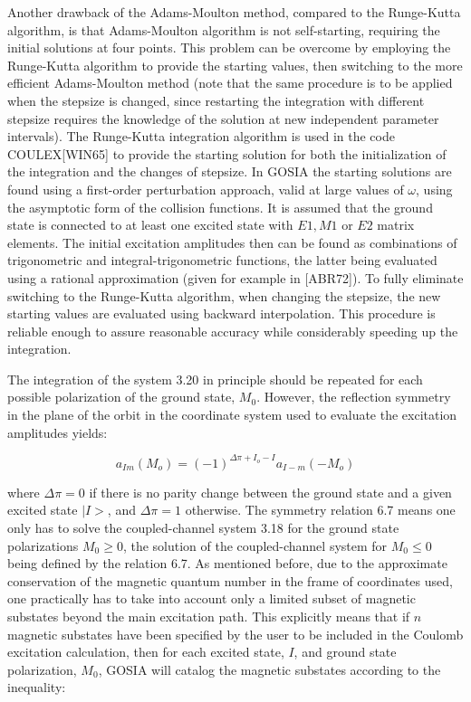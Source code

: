 \documentclass[10pt]{article}
\begin{document}
Another drawback of the Adams-Moulton method, compared to the Runge-Kutta algorithm, is that Adams-Moulton algorithm is not self-starting, requiring the initial solutions at four points. This problem can be overcome by employing the Runge-Kutta algorithm to provide the starting values, then switching to the more efficient Adams-Moulton method (note that the same procedure is to be applied when the stepsize is changed, since restarting the integration with different stepsize requires the knowledge of the solution at new independent parameter intervals). The Runge-Kutta integration algorithm is used in the code COULEX[WIN65] to provide the starting solution for both the initialization of the integration and the changes of stepsize. In GOSIA the starting solutions are found using a first-order perturbation approach, valid at large values of $\omega$, using the asymptotic form of the collision functions. It is assumed that the ground state is connected to at least one excited state with $E 1, M 1$ or $E 2$ matrix elements. The initial excitation amplitudes then can be found as combinations of trigonometric and integral-trigonometric functions, the latter being evaluated using a rational approximation (given for example in [ABR72]). To fully eliminate switching to the Runge-Kutta algorithm, when changing the stepsize, the new starting values are evaluated using backward interpolation. This procedure is reliable enough to assure reasonable accuracy while considerably speeding up the integration.

The integration of the system 3.20 in principle should be repeated for each possible polarization of the ground state, $M_{0}$. However, the reflection symmetry in the plane of the orbit in the coordinate system used to evaluate the excitation amplitudes yields:


\begin{equation*}
a_{I m}\left(M_{o}\right)=(-1)^{\Delta \pi+I_{o}-I} a_{I-m}\left(-M_{o}\right) \tag{6.7}
\end{equation*}


where $\Delta \pi=0$ if there is no parity change between the ground state and a given excited state $\mid I>$, and $\Delta \pi=1$ otherwise. The symmetry relation 6.7 means one only has to solve the coupled-channel system 3.18 for the ground state polarizations $M_{0} \geq 0$, the solution of the coupled-channel system for $M_{0} \leq 0$ being defined by the relation 6.7. As mentioned before, due to the approximate conservation of the magnetic quantum number in the frame of coordinates used, one practically has to take into account only a limited subset of magnetic substates beyond the main excitation path. This explicitly means that if $n$ magnetic substates have been specified by the user to be included in the Coulomb excitation calculation, then for each excited state, $I$, and ground state polarization, $M_{0}$, GOSIA will catalog the magnetic substates according to the inequality:
\end{document}
